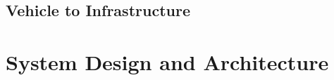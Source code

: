 \documentclass{llncs}
\begin{document}
{%
%		
%		
%		
%		
%		
		
		
			
		\subsection{Vehicle to Infrastructure}	
			\label{ss:V2I}
							
%		
		


	
	
	\section{System Design and Architecture}
		\label{s:section-4}	


}
\end{document}
